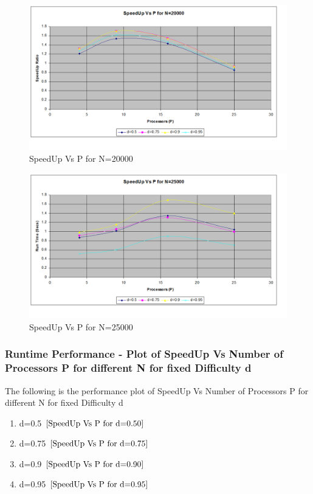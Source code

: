 \documentclass[twoside,11pt]{article}\usepackage{amsmath,amsfonts,amsthm,fullpage}
\begin{document}
\begin{figure}[!htbp]
\centering
\includegraphics[scale=.46]{charts/speedup_p_d_n_20000} 
\caption{SpeedUp Vs P for N=20000}
\label{SpeedUp Vs P for N=20000}
\end{figure}

\begin{figure}[!htbp]
\centering
\includegraphics[scale=.46]{charts/speedup_p_d_n_25000} 
\caption{SpeedUp Vs P for N=25000}
\label{SpeedUp Vs P for N=25000}
\end{figure}


\pagebreak
\subsubsection{Runtime Performance - Plot of SpeedUp Vs Number of Processors P for different N for fixed Difficulty d}
The following is the performance plot of SpeedUp Vs Number of Processors P for different N for fixed Difficulty d

\begin{enumerate}
\item
d=0.5 $\eqref{SpeedUp Vs P for d=0.50}$
\item
d=0.75 $\eqref{SpeedUp Vs P for d=0.75}$
\item
d=0.9 $\eqref{SpeedUp Vs P for d=0.90}$
\item
d=0.95 $\eqref{SpeedUp Vs P for d=0.95}$
\end{enumerate}
\end{document}
